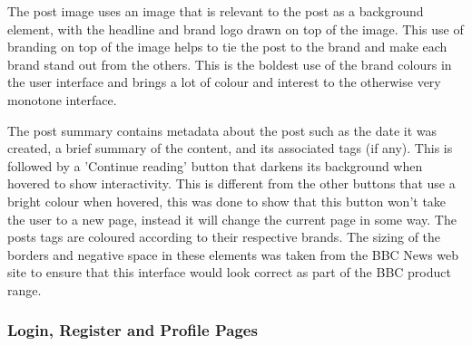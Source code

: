 \documentclass[12pt,titlepage]{article}
\begin{document}
    The post image uses an image that is relevant to the post as a background
    element, with the headline and brand logo drawn on top of the image. This
    use of branding on top of the image helps to tie the post to the brand and
    make each brand stand out from the others. This is the boldest use of the
    brand colours in the user interface and brings a lot of colour and interest
    to the otherwise very monotone interface.

    The post summary contains metadata about the post such as the date it was
    created, a brief summary of the content, and its associated tags (if any).
    This is followed by a 'Continue reading' button that darkens its background
    when hovered to show interactivity. This is different from the other
    buttons that use a bright colour when hovered, this was done to show that
    this button won't take the user to a new page, instead it will change the
    current page in some way. The posts tags are coloured according to their
    respective brands. The sizing of the borders and negative space in these
    elements was taken from the BBC News web site to ensure that this interface
    would look correct as part of the BBC product range.

    \subsubsection{Login, Register and Profile Pages}
\end{document}
